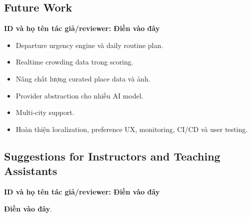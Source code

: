 \documentclass[12pt,a4paper]{article}
\newcommand{\dienvao}{\textbf{Điền vào đây}}
\newcommand{\tacgia}{%
  \begin{tcolorbox}[colback=blue!3,colframe=blue!25,boxrule=0.4pt,arc=1mm]
    \small\textbf{ID và họ tên tác giả/reviewer: Điền vào đây}
  \end{tcolorbox}
}
\begin{document}
\subsection{Future Work}
\tacgia

\begin{itemize}
    \item Departure urgency engine và daily routine plan.
    \item Realtime crowding data trong scoring.
    \item Nâng chất lượng curated place data và ảnh.
    \item Provider abstraction cho nhiều AI model.
    \item Multi-city support.
    \item Hoàn thiện localization, preference UX, monitoring, CI/CD và user testing.
\end{itemize}

\subsection{Suggestions for Instructors and Teaching Assistants}
\tacgia

\dienvao.
\end{document}
